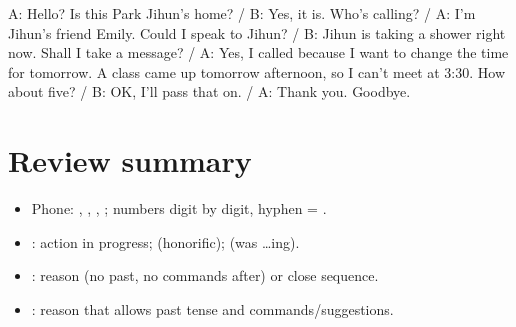 \noindent A: Hello? Is this Park Jihun's home? / B: Yes, it is. Who's calling? / A: I'm
Jihun's friend Emily. Could I speak to Jihun? / B: Jihun is taking a shower right now.
Shall I take a message? / A: Yes, I called because I want to change the time for
tomorrow. A class came up tomorrow afternoon, so I can't meet at 3:30. How about five?
/ B: OK, I'll pass that on. / A: Thank you. Goodbye.

\section*{Review summary}
\begin{itemize}
  \item Phone: , , ,
        ; numbers digit by digit, hyphen = .
  \item {}: action in progress;  (honorific);
         (was \ldots ing).
  \item {}: reason (no past, no commands after) or close sequence.
  \item {}: reason that allows past tense and commands/suggestions.
\end{itemize}
